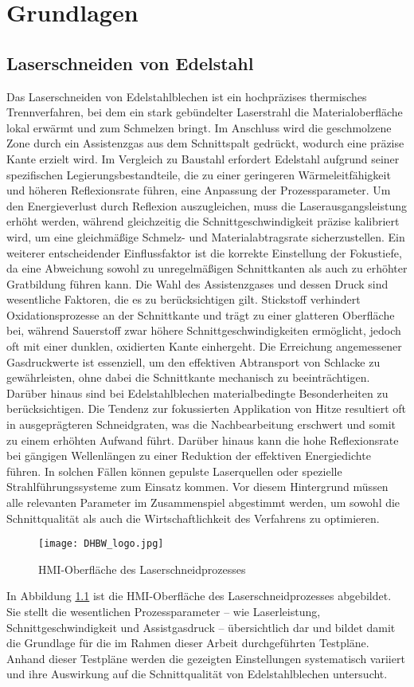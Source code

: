 \chapter{Grundlagen}
\section{Laserschneiden von Edelstahl}
Das Laserschneiden von Edelstahlblechen ist ein hochpräzises thermisches Trennverfahren, bei dem ein stark gebündelter Laserstrahl die Materialoberfläche lokal erwärmt und zum Schmelzen bringt. Im Anschluss wird die geschmolzene Zone durch ein Assistenzgas aus dem Schnittspalt gedrückt, wodurch eine präzise Kante erzielt wird. Im Vergleich zu Baustahl erfordert Edelstahl aufgrund seiner spezifischen Legierungsbestandteile, die zu einer geringeren Wärmeleitfähigkeit und höheren Reflexionsrate führen, eine Anpassung der Prozessparameter. Um den Energieverlust durch Reflexion auszugleichen, muss die Laserausgangsleistung erhöht werden, während gleichzeitig die Schnittgeschwindigkeit präzise kalibriert wird, um eine gleichmäßige Schmelz- und Materialabtragsrate sicherzustellen.
Ein weiterer entscheidender Einflussfaktor ist die korrekte Einstellung der Fokustiefe, da eine Abweichung sowohl zu unregelmäßigen Schnittkanten als auch zu erhöhter Gratbildung führen kann. Die Wahl des Assistenzgases und dessen Druck sind wesentliche Faktoren, die es zu berücksichtigen gilt. Stickstoff verhindert Oxidationsprozesse an der Schnittkante und trägt zu einer glatteren Oberfläche bei, während Sauerstoff zwar höhere Schnittgeschwindigkeiten ermöglicht, jedoch oft mit einer dunklen, oxidierten Kante einhergeht. Die Erreichung angemessener Gasdruckwerte ist essenziell, um den effektiven Abtransport von Schlacke zu gewährleisten, ohne dabei die Schnittkante mechanisch zu beeinträchtigen.
Darüber hinaus sind bei Edelstahlblechen materialbedingte Besonderheiten zu berücksichtigen. Die Tendenz zur fokussierten Applikation von Hitze resultiert oft in ausgeprägteren Schneidgraten, was die Nachbearbeitung erschwert und somit zu einem erhöhten Aufwand führt. Darüber hinaus kann die hohe Reflexionsrate bei gängigen Wellenlängen zu einer Reduktion der effektiven Energiedichte führen. In solchen Fällen können gepulste Laserquellen oder spezielle Strahlführungssysteme zum Einsatz kommen. Vor diesem Hintergrund müssen alle relevanten Parameter im Zusammenspiel abgestimmt werden, um sowohl die Schnittqualität als auch die Wirtschaftlichkeit des Verfahrens zu optimieren.

\begin{figure}[htbp]
    \centering
    \texttt{[image: DHBW\_logo.jpg]}
    \caption{HMI-Oberfläche des Laserschneidprozesses}
    \label{fig:DHBW_logo}
\end{figure}
In Abbildung \ref{fig:DHBW_logo} ist die HMI-Oberfläche des Laserschneidprozesses abgebildet. Sie stellt die wesentlichen Prozessparameter – wie Laserleistung, Schnittgeschwindigkeit und Assistgasdruck – übersichtlich dar und bildet damit die Grundlage für die im Rahmen dieser Arbeit durchgeführten Testpläne. Anhand dieser Testpläne werden die gezeigten Einstellungen systematisch variiert und ihre Auswirkung auf die Schnittqualität von Edelstahlblechen untersucht.

